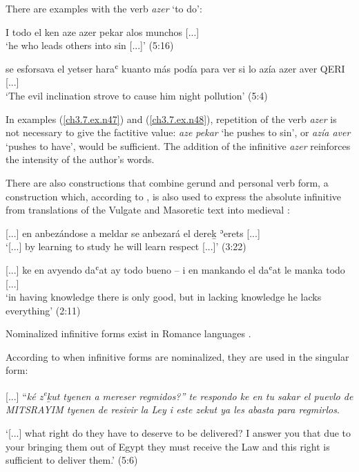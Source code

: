 \documentclass[output=paper,colorlinks,citecolor=brown,babel,arabicfont]{langscibook}
\begin{document}
There are examples with the verb \textit{azer} `to do':

\ea\label{ch3.7.ex.n47}
I todo el ken aze azer pekar alos munchos {[...]} \\
`he who leads others into sin {[...]}' (5:16)
\z

\ea\label{ch3.7.ex.n48}
se esforsava el yetser haraʿ  kuanto más podía para ver si lo azía azer aver QERI {[...]} \\
`The evil inclination strove to cause him night pollution' (5:4)
\z


In examples (\ref{ch3.7.ex.n47}) and (\ref{ch3.7.ex.n48}), repetition of the verb \textit{azer} is not necessary to give the factitive value: \textit{aze pekar} `he pushes to sin', or \textit{azía aver} `pushes to have', would be sufficient. The addition of the infinitive \textit{azer} reinforces the intensity of the author's words.

There are also constructions that combine gerund and personal verb form, a construction which, according to \citet[252]{sola-sole1983}, is also used to express the absolute infinitive from translations of the Vulgate and Masoretic text into medieval :

\ea\label{ch3.7.ex.n49}
{[...]} en anbezándose a meldar se anbezará el dere\b{k} ʾerets {[...]} \\
`{[...]} by learning to study he will learn respect {[...]}' (3:22)
\z

\ea\label{ch3.7.ex.n50}
{[...]} ke en avyendo daʿat  ay todo bueno -- i en mankando el daʿat le manka todo {[...]} \\
`in having knowledge there is only good, but in lacking knowledge he lacks everything' (2:11)
\z

\label{ch3.7.ss.3.3.5.2}

Nominalized infinitive forms exist in Romance languages \citep[244]{berenguer_amador2016}. 

According to \citet[243]{bornes-varol2008} when infinitive forms are nominalized, they are used in the singular form:

\ea \label{ch3.7.ex.n50b}
{[...]} ``\textit{ké z\textsuperscript{e}\b{k}ut tyenen a mereser regmidos?'' te respondo ke en tu sakar el puevlo de MITSRAYIM tyenen de resivir la Ley i este zekut ya les abasta para regmirlos}.

`{[...]} what right do they have to deserve to be delivered? I answer you that due to your bringing them out of Egypt they must receive the Law and this right is sufficient to deliver them.' (5:6)
\z
\end{document}
